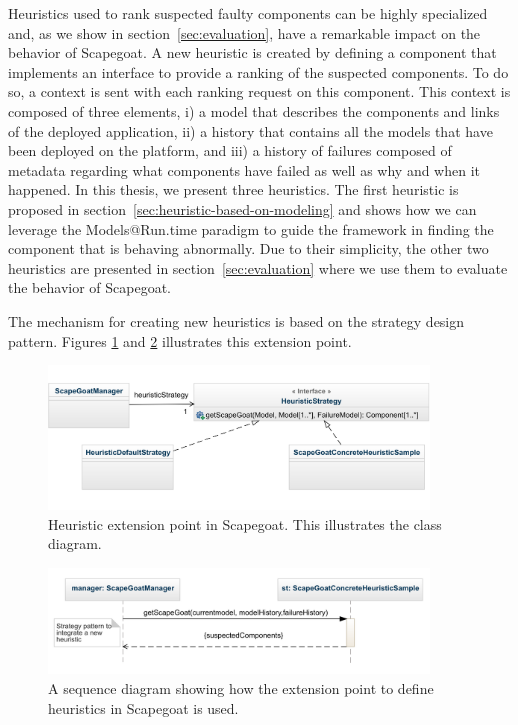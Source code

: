 Heuristics used to rank suspected faulty components can be highly specialized
and, as we show in section~\ref{sec:evaluation}, have a remarkable impact on the behavior of Scapegoat.
A new heuristic is created by defining a component that implements an interface to provide a ranking of the suspected components.
To do so, a context is sent with each ranking request on this component.
This context is composed of three elements, 
i) a model that describes the components and links of the deployed application, 
ii) a history that contains all the models that have been deployed on the platform, and 
iii) a history of failures composed of metadata regarding what components have failed as well as why and when it happened.
In this thesis, we present three heuristics.
The first heuristic is proposed in section~\ref{sec:heuristic-based-on-modeling} and shows how we can leverage the Models@Run.time paradigm to guide the framework in finding the component that is behaving abnormally.
Due to their simplicity, the other two heuristics are presented in section~\ref{sec:evaluation} where we use them to evaluate the behavior of Scapegoat.

The mechanism for creating new heuristics is based on the strategy design pattern. Figures \ref{fig:strategy-class} and \ref{fig:strategy-sequence} illustrates this extension point. 


\begin{figure}[h!]
\centering
\includegraphics[width=0.9\textwidth]{./chapter5/figures/strategy-class}
\caption{\label{fig:strategy-class}Heuristic extension point in Scapegoat. This illustrates the class diagram.}
\end{figure}

\begin{figure}[h!]
\centering
\includegraphics[width=0.9\textwidth]{./chapter5/figures/strategy-sequence}
\caption{\label{fig:strategy-sequence}A sequence diagram showing how the extension point to define heuristics in Scapegoat is used.}
\end{figure}

